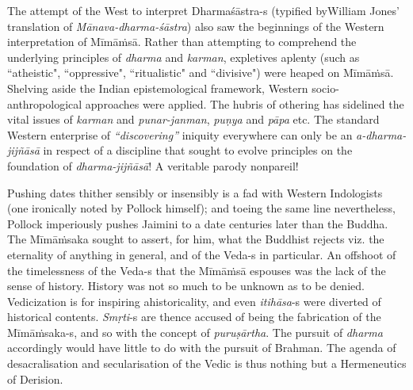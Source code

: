 The attempt of the West to interpret Dharmaśāstra-s (typified by\break William Jones’ translation of \textit{Mānava-dharma-śāstra}) also saw the beginnings of the Western interpretation of Mīmāṁsā. Rather than attempting to comprehend the underlying principles of \textit{dharma} and \textit{karman}, expletives aplenty (such as ``atheistic", ``oppressive", ``ritualistic" and ``divisive") were heaped on Mīmāṁsā. Shelving aside the Indian epistemological framework, Western socio-anthropological approaches were applied. The hubris of othering has sidelined the vital issues of \textit{karman} and \textit{punar-janman}, \textit{puṇya} and \textit{pāpa} etc. The standard Western enterprise of \textit{“discovering”} iniquity everywhere can only be an \textit{a-dharma-jijñāsā} in respect of a discipline that sought to evolve principles on the foundation of \textit{dharma-jijñāsā}! A veritable parody nonpareil!

Pushing dates thither sensibly or insensibly is a fad with Western Indologists (one ironically noted by Pollock himself); and toeing the same line nevertheless, Pollock imperiously pushes Jaimini to a date centuries later than the Buddha. The Mīmāṁsaka sought to assert, for him, what the Buddhist rejects viz. the eternality of anything in general, and of the Veda-s in particular. An offshoot of the timelessness of the Veda-s that the Mīmāṁsā espouses was the lack of the sense of history. History was not so much to be unknown as to be denied. Vedicization is for inspiring ahistoricality, and even \hbox{\textit{itihāsa}-s} were diverted of historical contents. \textit{Smṛti}-s are thence accused of being the fabrication of the Mīmāṁsaka-s, and so with the concept of \textit{puruṣārtha}. The pursuit of \textit{dharma} accordingly would have little to do with the pursuit of Brahman. The agenda of desacralisation and secularisation of the Vedic is thus nothing but a Hermeneutics of Derision.


